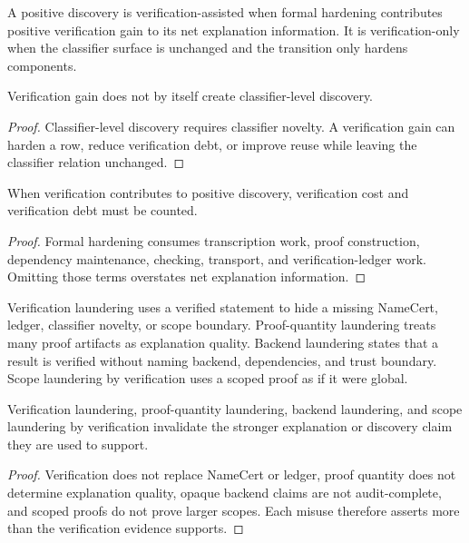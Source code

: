 \begin{definition}
\label{def:philosophy-component-verification-assisted-discovery}
A positive discovery is verification-assisted when formal hardening
contributes positive verification gain to its net explanation
information. It is verification-only when the classifier surface is
unchanged and the transition only hardens components.
\end{definition}

\begin{theorem}
\label{thm:philosophy-verification-gain-not-classifier-novelty}
Verification gain does not by itself create classifier-level discovery.
\end{theorem}
\begin{proof}
Classifier-level discovery requires classifier novelty. A verification
gain can harden a row, reduce verification debt, or improve reuse while
leaving the classifier relation unchanged.
\end{proof}

\begin{theorem}
\label{thm:philosophy-verification-assisted-discovery-counts-cost}
When verification contributes to positive discovery, verification cost
and verification debt must be counted.
\end{theorem}
\begin{proof}
Formal hardening consumes transcription work, proof construction,
dependency maintenance, checking, transport, and verification-ledger
work. Omitting those terms overstates net explanation information.
\end{proof}

\begin{definition}
\label{def:philosophy-verification-misuse}
Verification laundering uses a verified statement to hide a missing
NameCert, ledger, classifier novelty, or scope boundary. Proof-quantity
laundering treats many proof artifacts as explanation quality. Backend
laundering states that a result is verified without naming backend,
dependencies, and trust boundary. Scope laundering by verification uses a
scoped proof as if it were global.
\end{definition}

\begin{theorem}
\label{thm:philosophy-verification-misuse-invalidates-claim}
Verification laundering, proof-quantity laundering, backend laundering,
and scope laundering by verification invalidate the stronger explanation
or discovery claim they are used to support.
\end{theorem}
\begin{proof}
Verification does not replace NameCert or ledger, proof quantity does
not determine explanation quality, opaque backend claims are not
audit-complete, and scoped proofs do not prove larger scopes. Each misuse
therefore asserts more than the verification evidence supports.
\end{proof}

